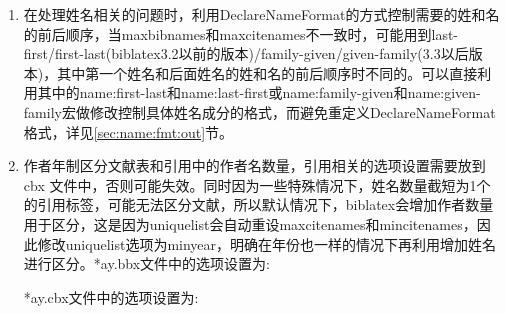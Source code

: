 \begin{enumerate}
\item 在处理姓名相关的问题时，利用DeclareNameFormat的方式控制需要的姓和名的前后顺序，当maxbibnames和maxcitenames不一致时，可能用到last-first/first-last(biblatex3.2以前的版本)/family-given/given-family(3.3以后版本)，其中第一个姓名和后面姓名的姓和名的前后顺序时不同的。可以直接利用其中的name:first-last和name:last-first或name:family-given和name:given-family宏做修改控制具体姓名成分的格式，而避免重定义DeclareNameFormat格式，详见\ref{sec:name:fmt:out}节。

\item 作者年制区分文献表和引用中的作者名数量，引用相关的选项设置需要放到cbx 文件中，否则可能失效。同时因为一些特殊情况下，姓名数量截短为1个的引用标签，可能无法区分文献，所以默认情况下，biblatex会增加作者数量用于区分，这是因为uniquelist会自动重设maxcitenames和mincitenames，因此修改uniquelist选项为minyear，明确在年份也一样的情况下再利用增加姓名进行区分。*ay.bbx文件中的选项设置为:
\begin{texlist}
\end{texlist}

*ay.cbx文件中的选项设置为:
\begin{texlist}
\end{texlist}
\end{enumerate}

